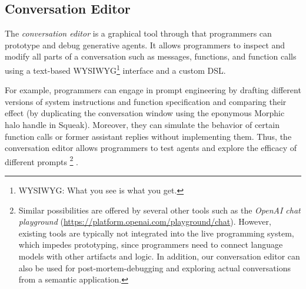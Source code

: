 \subsection{Conversation Editor}
\label{sec:semtex/tools/editor}

The \emph{conversation editor} is a graphical tool through that programmers can prototype and debug generative agents.
It allows programmers to inspect and modify all parts of a conversation such as messages, functions, and function calls using a text-based WYSIWYG\footnote{WYSIWYG: What you see is what you get.} interface and a custom DSL.

\FloatBarrier

For example, programmers can engage in prompt engineering by drafting different versions of system instructions and function specification and comparing their effect (by duplicating the conversation window using the eponymous Morphic halo handle in Squeak).
Moreover, they can simulate the behavior of certain function calls or former assistant replies without implementing them.
Thus, the conversation editor allows programmers to test agents and explore the efficacy of different prompts%
\footnote{%
	Similar possibilities are offered by several other tools such as the \emph{OpenAI chat playground} (\url{https://platform.openai.com/playground/chat}).
	However, existing tools are typically not integrated into the live programming system, which impedes prototyping, since programmers need to connect language models with other artifacts and logic.
	In addition, our conversation editor can also be used for post-mortem-debugging and exploring actual conversations from a semantic application.
}%
.

